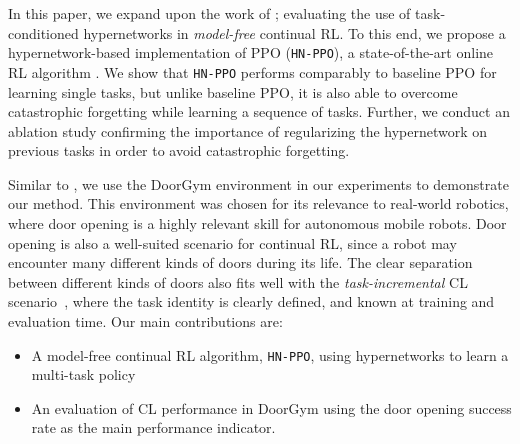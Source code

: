 \documentclass[dvipsnames]{article} %
\newcommand{\comment}[1]{{#1}}
\newcommand{\sa}[1] {\comment{{\color{cyan} SA: #1}}}                %
\newcommand{\commentOLD}[1]{}
\newcommand{\jhOLD}[1] {\commentOLD{{\color{RawSienna} JH: #1}}}           %
\newcommand{\asOLD}[1] {\commentOLD{{\color{orange} AS: #1}}}              %
\begin{document}
In this paper, we expand upon the work of \citet{MBRLHypernetworks}; evaluating the use of task-conditioned hypernetworks in \textit{model-free} continual RL. To this end, we propose a hypernetwork-based implementation of PPO (\texttt{HN-PPO}), a state-of-the-art online RL algorithm \asOLD{I would remove the "simple-to-implement", do not see the relevance}. 
We show that \texttt{HN-PPO} performs comparably to baseline PPO for learning single tasks, but unlike baseline PPO, it is also able to overcome catastrophic forgetting while learning a sequence of tasks.
Further, we conduct an ablation study confirming the importance of regularizing the hypernetwork on previous tasks in order to avoid catastrophic forgetting.

Similar to \citet{MBRLHypernetworks}, we use the DoorGym environment \citep{doorgym} in our experiments to demonstrate our method. This environment was chosen for its relevance to real-world robotics, where door opening is a highly relevant skill for autonomous mobile robots. Door opening is also a well-suited scenario for continual RL, since a robot may encounter many different kinds of doors during its life. The clear separation between different kinds of doors also fits well with the \textit{task-incremental} CL scenario~\citep{threescenarios}, where the task identity is clearly defined, and known at training and evaluation time. Our main contributions are:
\begin{itemize}
    \item A model-free continual RL algorithm, \texttt{HN-PPO}, using hypernetworks to learn a multi-task policy
    \item An evaluation of CL performance in DoorGym using the door opening success rate as the main performance indicator.
\end{itemize} 
\end{document}
